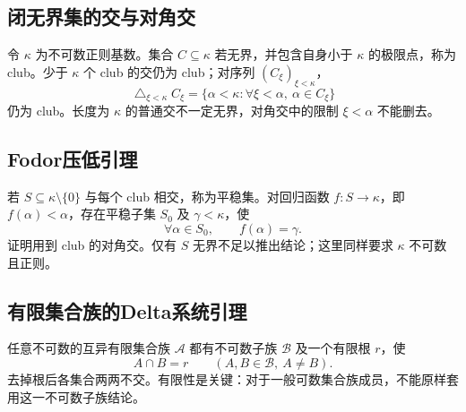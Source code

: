 \documentclass[../main.tex]{subfiles}
\begin{document}
\subsection{闭无界集的交与对角交}
令 $\kappa$ 为不可数正则基数。集合 $C\subseteq\kappa$ 若无界，并包含自身小于 $\kappa$ 的极限点，称为 club。少于 $\kappa$ 个 club 的交仍为 club；对序列 $(C_\xi)_{\xi<\kappa}$，
\[
\mathop{\triangle}_{\xi<\kappa}C_\xi
=\{\alpha<\kappa:\forall\xi<\alpha,\ \alpha\in C_\xi\}
\]
仍为 club。长度为 $\kappa$ 的普通交不一定无界，对角交中的限制 $\xi<\alpha$ 不能删去。
\subsection{Fodor压低引理}
若 $S\subseteq\kappa\setminus\{0\}$ 与每个 club 相交，称为平稳集。对回归函数 $f:S\to\kappa$，即 $f(\alpha)<\alpha$，存在平稳子集 $S_0$ 及 $\gamma<\kappa$，使
\[
\forall\alpha\in S_0,\qquad f(\alpha)=\gamma.
\]
证明用到 club 的对角交。仅有 $S$ 无界不足以推出结论；这里同样要求 $\kappa$ 不可数且正则。
\subsection{有限集合族的Delta系统引理}
任意不可数的互异有限集合族 $\mathcal A$ 都有不可数子族 $\mathcal B$ 及一个有限根 $r$，使
\[
A\cap B=r\qquad(A,B\in\mathcal B,\ A\ne B).
\]
去掉根后各集合两两不交。有限性是关键：对于一般可数集合族成员，不能原样套用这一不可数子族结论。
\clearpage
\end{document}
